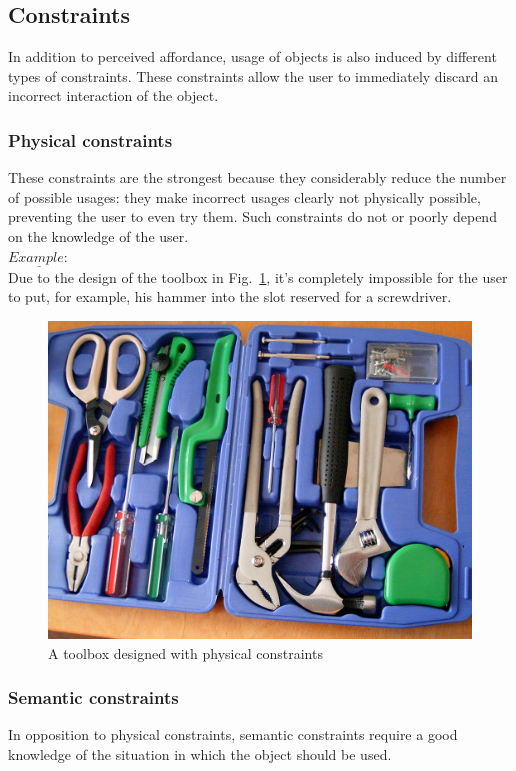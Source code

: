 \documentclass[a4paper,11pt] {article}
\theoremstyle{definition}
\begin{document}
    \subsection{Constraints}
    In addition to perceived affordance, usage of objects is also induced by different types of constraints. These constraints allow the user to immediately discard an incorrect interaction of the object.

        \subsubsection{Physical constraints}
        These constraints are the strongest because they considerably reduce the number of possible usages: they make incorrect usages clearly not physically possible, preventing the user to even try them. Such constraints do not or poorly depend on the knowledge of the user.\\

        $\underline{Example:}$\\
        Due to the design of the toolbox in Fig.~\ref{fig:phys-constr-toolbox}, it's completely impossible for the user to put, for example, his hammer into the slot reserved for a screwdriver.
        \begin{figure}[h]
        \centering
        \includegraphics[scale=0.1]{fig-report/toolbox.jpg}
        \caption{A toolbox designed with physical constraints}
        \label{fig:phys-constr-toolbox}
        \end{figure}

        \subsubsection{Semantic constraints}
       In opposition to physical constraints, semantic constraints require a good knowledge of the situation in which the object should be used.\\
\end{document}
